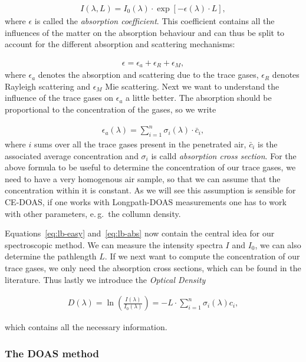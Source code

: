 \begin{align}
  I(\lambda, L) = I_0(\lambda) \cdot \exp[-\epsilon(\lambda) \cdot
  L], \label{eq:lb-easy}
\end{align}
where $\epsilon$ is called the \emph{absorption coefficient}. This
coefficient contains all the influences of the matter on the
absorption behaviour and can thus be split to account for the different
absorption and scattering mechanisms:

\begin{align*}
  \epsilon = \epsilon_a + \epsilon_R + \epsilon_M,
\end{align*}
where $\epsilon_a$ denotes the absorption and scattering due to the
trace gases, $\epsilon_R$ denotes Rayleigh scattering and $\epsilon_M$
Mie scattering. Next we want to understand the influence of the trace
gases on $\epsilon_a$ a little better. The absorption should be
proportional to the concentration of the gases, so we write

\begin{align}
  \epsilon_a(\lambda) = \sum_{i=1}^n \sigma_i(\lambda) \cdot \bar c_i, \label{eq:lb-abs}
\end{align}
where $i$ sums over all the trace gases present in the penetrated
air, $\bar c_i$ is the associated average concentration and $\sigma_i$
is calld \emph{absorption cross section}. For the above formula to be
useful to determine the concentration of our trace gases, we need to
have a very homogenous air sample, so that we can assume that the
concentration within it is constant. As we will see this assumption is
sensible for CE-DOAS, if one works with Longpath-DOAS measurements one
has to work with other parameters, e.\,g.\ the collumn density.

Equations~\eqref{eq:lb-easy} and~\eqref{eq:lb-abs} now contain the central idea for our
spectroscopic method. We can measure the intensity spectra $I$ and
$I_0$, we can also determine the pathlength $L$. If we next want to
compute the concentration of our trace gases, we only need the
absorption cross sections, which can be found in the
literature. Thus lastly we introduce the \emph{Optical
  Density} 

\begin{align*}
  D(\lambda) = \ln \left(\frac{I(\lambda)}{I_0(\lambda)}\right) = - L
  \cdot \sum_{i=1}^n \sigma_i(\lambda) c_i,
\end{align*}

which contains all the necessary information.

\subsubsection{The DOAS method}
\label{sec:doas}

